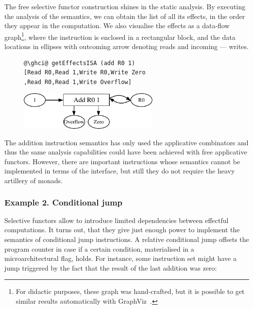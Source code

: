 The free selective functor construction shines in the static analysis. By executing
the analysis of the  semantics, we can obtain the list of all its effects,
in the order they appear in the computation. We also visualise the effects as a data-flow
graph\footnote{For didactic purposes,
these graph was hand-crafted, but it is possible to get similar results automatically
with GraphViz~\cite{graphviz}.}, where the instruction is enclosed in a rectangular block,
and the data locations in ellipses with outcoming arrow denoting reads and incoming --- writes.

\begin{figure}[!h]
 \begin{minipage}{0.45\textwidth}
\raggedleft
\begin{verbatim}
@\ghci@ getEffectsISA (add R0 1)
[Read R0,Read 1,Write R0,Write Zero
,Read R0,Read 1,Write Overflow]
\end{verbatim}
 \end{minipage}
 \begin{minipage}{0.45\textwidth}
  \centering
  \includegraphics[width=7cm]{./fig/add.pdf}
 \end{minipage}
\end{figure}

The addition instruction semantics has only used the applicative combinators and thus
the same analysis capabilities could have been achieved with free applicative functors.
However, there are important instructions whose semantics cannot be implemented in terms
of the  interface, but still they do not require the heavy artillery of monads.

\subsubsection{\textbf{Example 2. Conditional jump}}

Selective functors allow to introduce limited dependencies between effectful computations.
It turns out, that they give just enough power to implement the semantics of conditional
jump instructions. A relative conditional jump offsets the program counter in case if a
certain condition, materialised in a microarchitectural flag, holds. For instance, some
instruction set might have a jump triggered by the fact that the result of the last addition
was zero:

